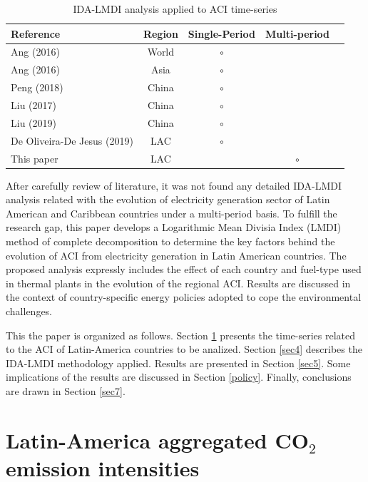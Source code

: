 \documentclass[energies,article,accept,moreauthors,12pt,a4paper]{mdpi} %
\begin{document}
		\begin{table}[!ht]													
		\begin{center}\caption{IDA-LMDI analysis applied to ACI time-series}													
		\begin{tabular}{lcccc}\hline				Reference	&	Region	&	Single-Period	& Multi-period 	\\	\hline
		Ang (2016)	\cite{ang2016} 	&	World	&	$\circ$	&		 	\\
		Ang (2016)	\cite{goh} 	&	Asia	&	$\circ$	&		 	\\
		Peng (2018)	\cite{peng} 	&	China	&	$\circ$	&			\\
				Liu (2017)	\cite{liu} 	&	China	&	$\circ$	& 			\\
		Liu (2019)	\cite{liu2} 	&	China	&	$\circ$	& 			\\
		De Oliveira-De Jesus (2019)	\cite{oliv} &	LAC 	&   $\circ$ &	 		\\ 

		This paper &	LAC 	&   &	 	 $\circ$	\\
		\hline
		\end{tabular}\label{tableLMDI0}	
		\end{center}				
		\end{table}							


After carefully review of literature, it was not found any detailed IDA-LMDI analysis related with the evolution of electricity generation sector of Latin American and Caribbean countries under a multi-period basis.
   To fulfill the research gap, this paper develops a Logarithmic Mean Divisia Index (LMDI) method of complete decomposition to determine the key factors behind the evolution of ACI from electricity generation in Latin American countries. The proposed analysis expressly includes the effect of each country and fuel-type used in thermal plants in the evolution of the regional ACI.  Results are discussed in the context of country-specific energy policies adopted to cope the environmental challenges.

This the paper is organized as follows. Section \ref{sec3} presents the time-series related to the ACI of Latin-America countries to be analized. Section \ref{sec4} describes
the IDA-LMDI methodology applied. Results are presented in Section \ref{sec5}. Some implications of the results are discussed in Section \ref{policy}. Finally, conclusions are drawn in Section \ref{sec7}.



\section{Latin-America aggregated CO$_2$ emission intensities}  \label{sec3}
\end{document}
